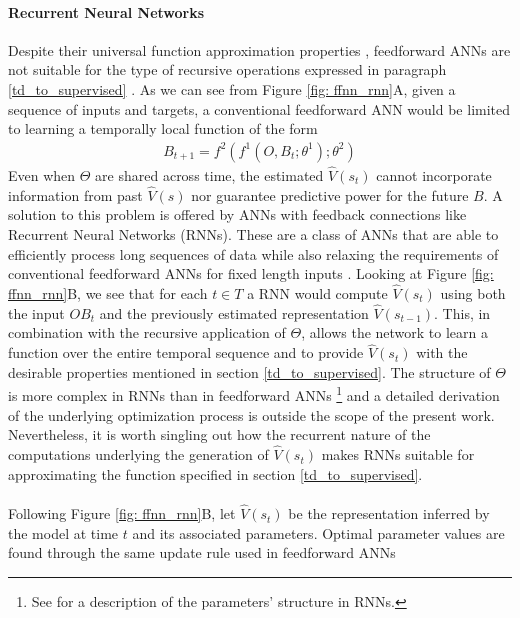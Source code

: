 \paragraph{\textbf{Recurrent Neural Networks}}
\label{rnn_theory}
Despite their universal function approximation properties \cite{hornik1989multilayer}, feedforward ANNs are not suitable for the type of recursive operations expressed in paragraph \ref{td_to_supervised} \cite{bengio2017deep}. As we can see from Figure \ref{fig: ffnn_rnn}A, given a sequence of inputs and targets, a conventional feedforward ANN would be limited to learning a temporally local function of the form
\begin{gather}
\label{td_ffnn}
    B_{t+1} = f^2(f^1(O, B_{t}; \theta^{1}); \theta^{2})
\end{gather}
Even when $\Theta$ are shared across time, the estimated $\widehat{V}(s_t)$ cannot incorporate information from past $\widehat{V}(s)$ nor guarantee predictive power for the future $B$. A solution to this problem is offered by ANNs with feedback connections like Recurrent Neural Networks (RNNs). These  are a class of ANNs that are able to efficiently process long sequences of data while also relaxing the requirements of conventional feedforward ANNs for fixed length inputs \cite{bengio2017deep}. Looking at Figure \ref{fig: ffnn_rnn}B, we see that for each $t \in T$ a RNN would compute $\widehat{V}(s_t)$ using both the input $OB_{t}$ and the previously estimated representation $\widehat{V}(s_{t-1})$. This, in combination with the recursive application of $\Theta$, allows the network to learn a function over the entire temporal sequence and to provide $\widehat{V}(s_t)$ with the desirable properties mentioned in section \ref{td_to_supervised}. The structure of $\Theta$ is more complex in RNNs than in feedforward ANNs \footnote{See \cite{bengio2017deep} for a description of the parameters' structure in RNNs.} and a detailed derivation of the underlying optimization process is outside the scope of the present work. Nevertheless, it is worth singling out how the recurrent nature of the computations underlying the generation of $\widehat{V}(s_t)$  makes RNNs suitable for approximating the function specified in section \ref{td_to_supervised}. \\
\\
Following Figure \ref{fig: ffnn_rnn}B, let $\widehat{V}(s_t)$ be the representation inferred by the model at time $t$ and its associated parameters. Optimal parameter values are found through the same update rule used in feedforward ANNs
